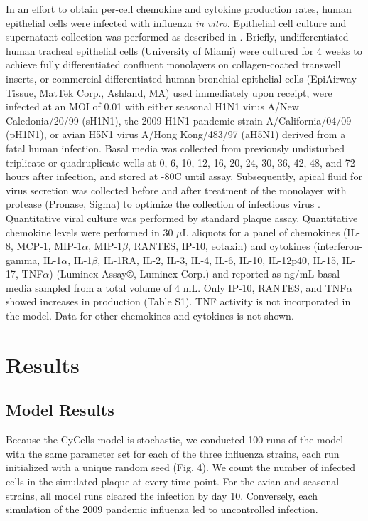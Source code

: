 \documentclass[preprint,10pt,authoryear]{elsarticle}
\begin{document}
In an effort to obtain per-cell chemokine and cytokine production rates, human epithelial cells were infected with influenza \textit{in vitro}.  Epithelial cell culture and supernatant collection was performed as described in \citep{Mitchell2011}.  Briefly, undifferentiated human tracheal epithelial cells (University of Miami) were cultured for 4 weeks to achieve fully differentiated confluent monolayers on collagen-coated transwell inserts, or commercial differentiated human bronchial epithelial cells (EpiAirway Tissue, MatTek Corp., Ashland, MA) used immediately upon receipt, were infected at an MOI of 0.01 with either seasonal H1N1 virus A/New Caledonia/20/99 (sH1N1), the 2009 H1N1 pandemic strain A/California/04/09 (pH1N1), or avian H5N1 virus A/Hong Kong/483/97 (aH5N1) derived from a fatal human infection.  Basal media was collected from previously undisturbed triplicate or quadruplicate wells at 0, 6, 10, 12, 16, 20, 24, 30, 36, 42, 48, and 72 hours after infection, and stored at -80C until assay.  Subsequently, apical fluid for virus secretion was collected before and after treatment of the monolayer with protease (Pronase, Sigma) to optimize the collection of infectious virus \citep{Mitchell2011}.  Quantitative viral culture was performed by standard plaque assay.  Quantitative chemokine levels were performed in 30 $\mu$L aliquots for a panel of chemokines (IL-8, MCP-1, MIP-1$\alpha$, MIP-1$\beta$, RANTES, IP-10, eotaxin) and cytokines (interferon-gamma, IL-1$\alpha$, IL-1$\beta$, IL-1RA, IL-2, IL-3, IL-4, IL-6, IL-10, IL-12p40, IL-15, IL-17, TNF$\alpha$) (Luminex Assay®, Luminex Corp.) and reported as ng/mL basal media sampled from a total volume of 4 mL.  Only IP-10, RANTES, and TNF$\alpha$ showed increases in production (Table S1).  TNF activity is not incorporated in the model.  Data for other chemokines and cytokines is not shown.



\section*{Results}

\subsection*{Model Results}

Because the CyCells model is stochastic, we conducted 100 runs of the model with the same parameter set for each of the three influenza strains, each run initialized with a unique random seed (Fig. 4).  We count the number of infected cells in the simulated plaque at every time point.  For the avian and seasonal strains, all model runs cleared the infection by day 10.  Conversely, each simulation of the 2009 pandemic influenza led to uncontrolled infection. 
\end{document}
